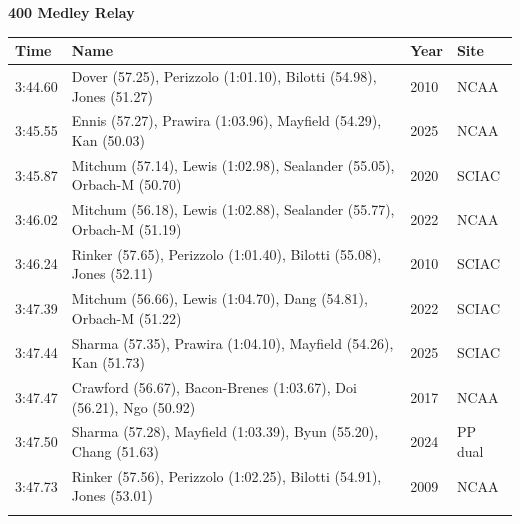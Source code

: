 \noindent\begin{minipage}[t]{0.98\textwidth}
\centering
\textbf{\textcolor{teamprimary}{400 Medley Relay}}\par
\vspace{0.5em}
\centering
\small
\renewcommand{\arraystretch}{1.0}
\setlength{\tabcolsep}{4pt}
\begin{tabular}{@{}p{2.7cm}p{4.3cm}p{1.6cm}p{2.7cm}@{}}
\toprule
\textbf{Time} & \textbf{Name} & \textbf{Year} & \textbf{Site} \\
\midrule
3:44.60 & Dover (57.25), Perizzolo (1:01.10), Bilotti (54.98), Jones (51.27) & 2010 & NCAA \\
3:45.55 & Ennis (57.27), Prawira (1:03.96), Mayfield (54.29), Kan (50.03) & 2025 & NCAA \\
3:45.87 & Mitchum (57.14), Lewis (1:02.98), Sealander (55.05), Orbach-M (50.70) & 2020 & SCIAC \\
3:46.02 & Mitchum (56.18), Lewis (1:02.88), Sealander (55.77), Orbach-M (51.19) & 2022 & NCAA \\
3:46.24 & Rinker (57.65), Perizzolo (1:01.40), Bilotti (55.08), Jones (52.11) & 2010 & SCIAC \\
3:47.39 & Mitchum (56.66), Lewis (1:04.70), Dang (54.81), Orbach-M (51.22) & 2022 & SCIAC \\
3:47.44 & Sharma (57.35), Prawira (1:04.10), Mayfield (54.26), Kan (51.73) & 2025 & SCIAC \\
3:47.47 & Crawford (56.67), Bacon-Brenes (1:03.67), Doi (56.21), Ngo (50.92) & 2017 & NCAA \\
3:47.50 & Sharma (57.28), Mayfield (1:03.39), Byun (55.20), Chang (51.63) & 2024 & PP dual \\
3:47.73 & Rinker (57.56), Perizzolo (1:02.25), Bilotti (54.91), Jones (53.01) & 2009 & NCAA \\
\bottomrule
\vspace{0.5em}
\end{tabular}
\end{minipage}
\clearpage
